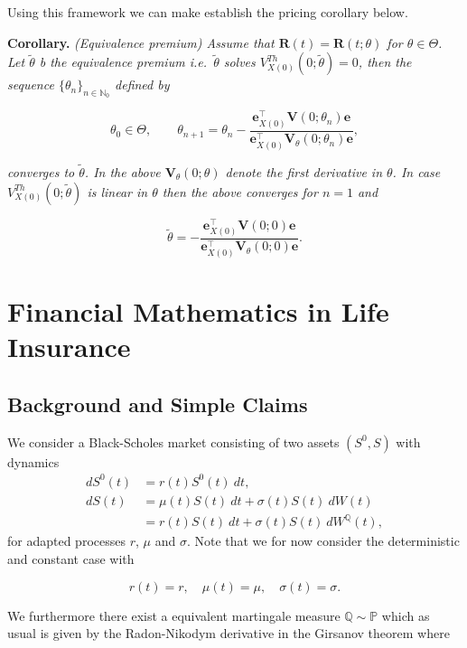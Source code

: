 \documentclass[a4paper,12pt,openany]{book}
\begin{document}
Using this framework we can make establish the pricing corollary below.

\textbf{Corollary.} \emph{(Equivalence premium) Assume that \(\mathbf R(t)=\mathbf R(t;\theta)\) for \(\theta\in\Theta\). Let \(\tilde\theta\) b the equivalence premium i.e.~\(\tilde \theta\) solves \(V^{Th}_{X(0)}(0;\tilde\theta)=0\), then the sequence \(\{\theta_n\}_{n\in \mathbb N_0}\) defined by}

\[
\theta_0\in\Theta,\qquad \theta_{n+1}=\theta_{n}-\frac{\mathbf e_{X(0)}^\top\mathbf V(0;\theta_n)\mathbf e}{\mathbf e_{X(0)}^\top\mathbf V_\theta(0;\theta_n)\mathbf e},
\]

\emph{converges to \(\tilde\theta\). In the above \(\mathbf V_\theta(0;\theta)\) denote the first derivative in \(\theta\). In case \(V^{Th}_{X(0)}(0;\tilde\theta)\) is linear in \(\theta\) then the above converges for \(n=1\) and}

\[
\tilde\theta = -\frac{\mathbf e_{X(0)}^\top\mathbf V(0;0)\mathbf e}{\mathbf e_{X(0)}^\top\mathbf V_\theta(0;0)\mathbf e}.
\]

\hypertarget{financial-mathematics-in-life-insurance}{%
\section{Financial Mathematics in Life Insurance}\label{financial-mathematics-in-life-insurance}}

\hypertarget{background-and-simple-claims}{%
\subsection{Background and Simple Claims}\label{background-and-simple-claims}}

We consider a Black-Scholes market consisting of two assets \((S^0,S)\) with dynamics
\begin{align*}
dS^0(t)&=r(t)S^0(t)\ dt,\\
dS(t)&=\mu(t)S(t)\ dt+\sigma(t) S(t)\ dW(t)\\
&=r(t)S(t)\ dt + \sigma(t)S(t)\ dW^{\mathbb Q}(t),
\end{align*}
for adapted processes \(r\), \(\mu\) and \(\sigma\). Note that we for now consider the deterministic and constant case with

\[
r(t)=r,\quad\mu(t)=\mu, \quad\sigma(t)=\sigma.
\]

We furthermore there exist a equivalent martingale measure \(\mathbb Q\sim \mathbb P\) which as usual is given by the Radon-Nikodym derivative in the Girsanov theorem where
\end{document}

